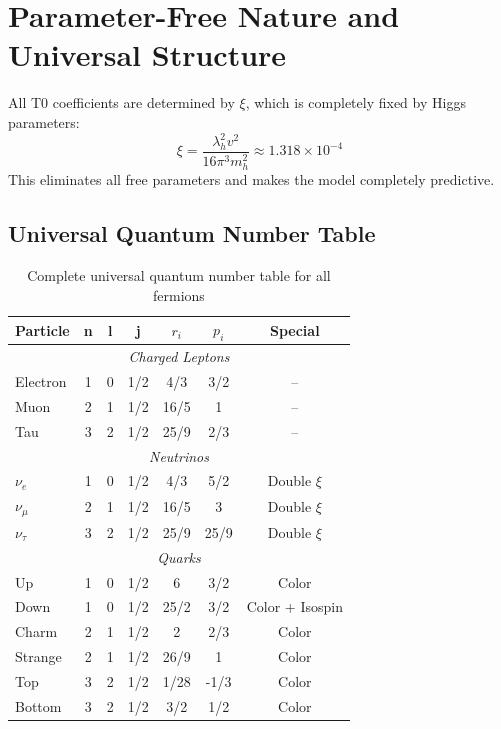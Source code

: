 	\section{Parameter-Free Nature and Universal Structure}
	\label{sec:parameter_free_nature}
	
	\begin{important}
		All T0 coefficients are determined by $\xi$, which is completely fixed by Higgs parameters:
		\begin{equation}
			\xi = \frac{\lambda_h^2 v^2}{16\pi^3 m_h^2} \approx 1.318 \times 10^{-4}
		\end{equation}
		This eliminates all free parameters and makes the model completely predictive.
	\end{important}
	
	\subsection{Universal Quantum Number Table}
	\label{subsec:universal_quantum_table}
	
	\begin{table}[H]
		\centering
		\begin{tabular}{lcccccc}
			\toprule
			\textbf{Particle} & \textbf{n} & \textbf{l} & \textbf{j} & \textbf{$r_i$} & \textbf{$p_i$} & \textbf{Special} \\
			\midrule
			\multicolumn{7}{c}{\textit{Charged Leptons}} \\
			\midrule
			Electron & 1 & 0 & 1/2 & 4/3 & 3/2 & -- \\
			Muon & 2 & 1 & 1/2 & 16/5 & 1 & -- \\
			Tau & 3 & 2 & 1/2 & 25/9 & 2/3 & -- \\
			\midrule
			\multicolumn{7}{c}{\textit{Neutrinos}} \\
			\midrule
			$\nu_e$ & 1 & 0 & 1/2 & 4/3 & 5/2 & Double $\xi$ \\
			$\nu_\mu$ & 2 & 1 & 1/2 & 16/5 & 3 & Double $\xi$ \\
			$\nu_\tau$ & 3 & 2 & 1/2 & 25/9 & 25/9 & Double $\xi$ \\
			\midrule
			\multicolumn{7}{c}{\textit{Quarks}} \\
			\midrule
			Up & 1 & 0 & 1/2 & 6 & 3/2 & Color \\
			Down & 1 & 0 & 1/2 & 25/2 & 3/2 & Color + Isospin \\
			Charm & 2 & 1 & 1/2 & 2 & 2/3 & Color \\
			Strange & 2 & 1 & 1/2 & 26/9 & 1 & Color \\
			Top & 3 & 2 & 1/2 & 1/28 & -1/3 & Color \\
			Bottom & 3 & 2 & 1/2 & 3/2 & 1/2 & Color \\
			\bottomrule
		\end{tabular}
		\caption{Complete universal quantum number table for all fermions}
		\label{tab:universal_quantum_numbers}
	\end{table}
	
